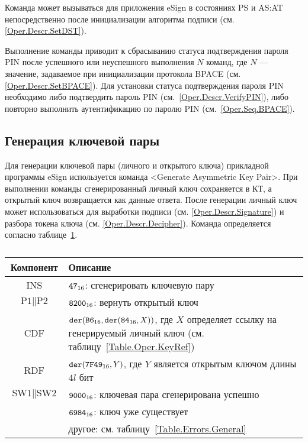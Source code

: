 
Команда может вызываться для приложения eSign в состояниях 
PS и AS:AT непосредственно после инициализации алгоритма подписи
(см. \ref{Oper.Descr.SetDST}).

Выполнение команды приводит к сбрасыванию статуса подтверждения пароля PIN
после успешного или неуспешного выполнения $N$ команд, где $N$ --- значение, 
задаваемое при инициализации протокола BPACE (см. \ref{Oper.Descr.SetBPACE}).
Для установки статуса подтверждения пароля PIN 
необходимо либо подтвердить пароль PIN (см.~\ref{Oper.Descr.VerifyPIN}), 
либо повторно выполнить аутентификацию по паролю PIN (см.~\ref{Oper.Seq.BPACE}).


\subsection{Генерация ключевой пары}\label{Oper.Descr.GenKeys}

Для генерации ключевой пары (личного и открытого ключа) прикладной программы eSign
используется команда <Generate Asymmetric Key Pair>. При выполнении команды 
сгенерированный личный ключ сохраняется в КТ,
а открытый ключ возвращается как данные ответа.
После генерации личный ключ может использоваться 
для выработки подписи (см. \ref{Oper.Descr.Signature}) и
разбора токена ключа (см. \ref{Oper.Descr.Decipher}).
Команда определяется согласно 
таблице~\ref{Table.Oper.GenKeysCmd}.

\begin{table}[hbt]
\caption{}\label{Table.Oper.GenKeysCmd}
\begin{tabular}{|c|p{14cm}|}
\hline
Компонент & Описание\\
\hline
\hline
INS & $\texttt{47}_{16}$: сгенерировать ключевую пару \\
\hline
$\text{P1} \parallel\text{P2}$ & $\texttt{8200}_{16}$:
вернуть открытый ключ \\
\hline
CDF & $\texttt{der}(\texttt{B6}_{16},\texttt{der}(\texttt{84}_{16}, X))$,
где $X$ определяет ссылку на генерируемый личный ключ
(см. таблицу~\ref{Table.Oper.KeyRef}) \\
\hline 
RDF & $\texttt{der}(\texttt{7F49}_{16}, Y)$, где $Y$ является открытым ключом длины $4l$ бит\\
\hline
$\text{SW1} \parallel \text{SW2}$ & 
$\texttt{9000}_{16}$: ключевая пара сгенерирована успешно \\
  & $\texttt{6984}_{16}$: ключ уже существует \\
  & другое: см. таблицу~\ref{Table.Errors.General} \\
\hline
\end{tabular}
\end{table}

